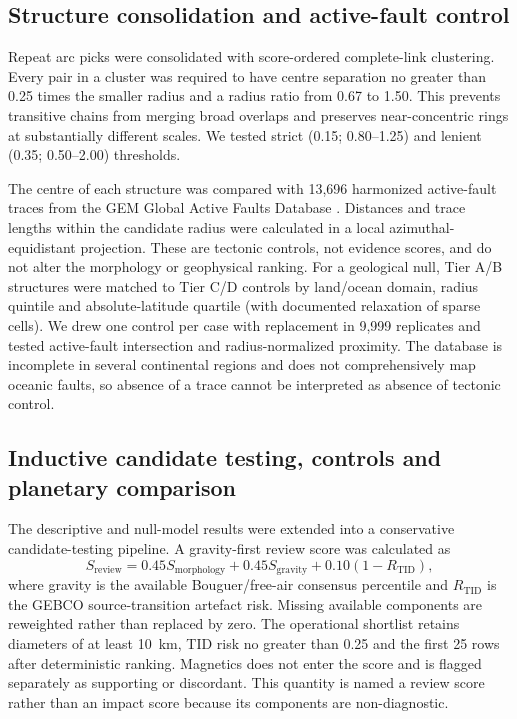 \documentclass[11pt]{article}
\begin{document}
\subsection{Structure consolidation and active-fault control}
Repeat arc picks were consolidated with score-ordered complete-link clustering. Every pair in a cluster was required to have centre separation no greater than 0.25 times the smaller radius and a radius ratio from 0.67 to 1.50. This prevents transitive chains from merging broad overlaps and preserves near-concentric rings at substantially different scales. We tested strict (0.15; 0.80--1.25) and lenient (0.35; 0.50--2.00) thresholds.

The centre of each structure was compared with 13,696 harmonized active-fault traces from the GEM Global Active Faults Database \cite{StyronPagani2020}. Distances and trace lengths within the candidate radius were calculated in a local azimuthal-equidistant projection. These are tectonic controls, not evidence scores, and do not alter the morphology or geophysical ranking. For a geological null, Tier A/B structures were matched to Tier C/D controls by land/ocean domain, radius quintile and absolute-latitude quartile (with documented relaxation of sparse cells). We drew one control per case with replacement in 9,999 replicates and tested active-fault intersection and radius-normalized proximity. The database is incomplete in several continental regions and does not comprehensively map oceanic faults, so absence of a trace cannot be interpreted as absence of tectonic control.

\subsection{Inductive candidate testing, controls and planetary comparison}
The descriptive and null-model results were extended into a conservative candidate-testing pipeline. A gravity-first review score was calculated as
\[
S_{\mathrm{review}}=0.45S_{\mathrm{morphology}}+0.45S_{\mathrm{gravity}}+0.10(1-R_{\mathrm{TID}}),
\]
where gravity is the available Bouguer/free-air consensus percentile and $R_{\mathrm{TID}}$ is the GEBCO source-transition artefact risk. Missing available components are reweighted rather than replaced by zero. The operational shortlist retains diameters of at least 10~km, TID risk no greater than 0.25 and the first 25 rows after deterministic ranking. Magnetics does not enter the score and is flagged separately as supporting or discordant. This quantity is named a review score rather than an impact score because its components are non-diagnostic.
\end{document}
